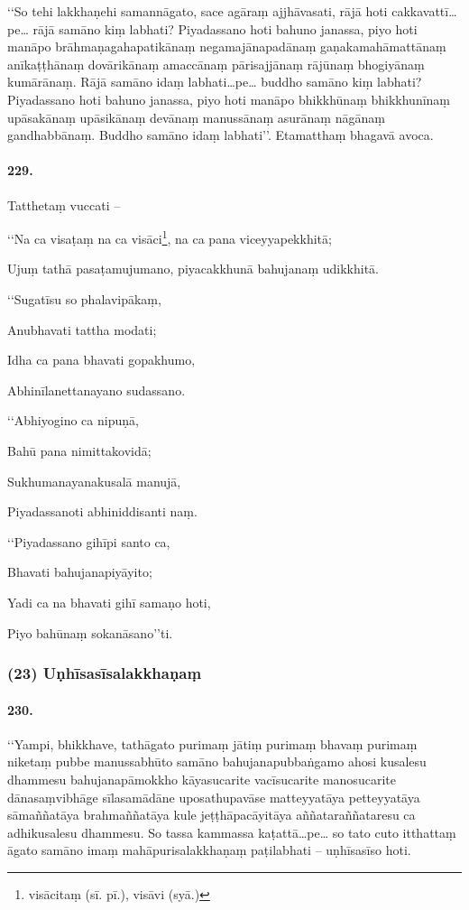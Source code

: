 ‘‘So tehi lakkhaṇehi samannāgato, sace agāraṃ ajjhāvasati, rājā hoti cakkavattī…pe… rājā samāno kiṃ labhati? Piyadassano hoti bahuno janassa, piyo hoti manāpo brāhmaṇagahapatikānaṃ negamajānapadānaṃ gaṇakamahāmattānaṃ anīkaṭṭhānaṃ dovārikānaṃ amaccānaṃ pārisajjānaṃ rājūnaṃ bhogiyānaṃ kumārānaṃ. Rājā samāno idaṃ labhati…pe… buddho samāno kiṃ labhati? Piyadassano hoti bahuno janassa, piyo hoti manāpo bhikkhūnaṃ bhikkhunīnaṃ upāsakānaṃ upāsikānaṃ devānaṃ manussānaṃ asurānaṃ nāgānaṃ gandhabbānaṃ. Buddho samāno idaṃ labhati’’. Etamatthaṃ bhagavā avoca.

\paragraph{229.} Tatthetaṃ vuccati –

‘‘Na ca visaṭaṃ na ca visāci\footnote{visācitaṃ (sī. pī.), visāvi (syā.)}, na ca pana viceyyapekkhitā;

Ujuṃ tathā pasaṭamujumano, piyacakkhunā bahujanaṃ udikkhitā.

‘‘Sugatīsu so phalavipākaṃ,

Anubhavati tattha modati;

Idha ca pana bhavati gopakhumo,

Abhinīlanettanayano sudassano.

‘‘Abhiyogino ca nipuṇā,

Bahū pana nimittakovidā;

Sukhumanayanakusalā manujā,

Piyadassanoti abhiniddisanti naṃ.

‘‘Piyadassano gihīpi santo ca,

Bhavati bahujanapiyāyito;

Yadi ca na bhavati gihī samaṇo hoti,

Piyo bahūnaṃ sokanāsano’’ti.

\subsubsection{(23) Uṇhīsasīsalakkhaṇaṃ}

\paragraph{230.} ‘‘Yampi, bhikkhave, tathāgato purimaṃ jātiṃ purimaṃ bhavaṃ purimaṃ niketaṃ pubbe manussabhūto samāno bahujanapubbaṅgamo ahosi kusalesu dhammesu bahujanapāmokkho kāyasucarite vacīsucarite manosucarite dānasaṃvibhāge sīlasamādāne uposathupavāse matteyyatāya petteyyatāya sāmaññatāya brahmaññatāya kule jeṭṭhāpacāyitāya aññataraññataresu ca adhikusalesu dhammesu. So tassa kammassa kaṭattā…pe… so tato cuto itthattaṃ āgato samāno imaṃ mahāpurisalakkhaṇaṃ paṭilabhati – uṇhīsasīso hoti.

